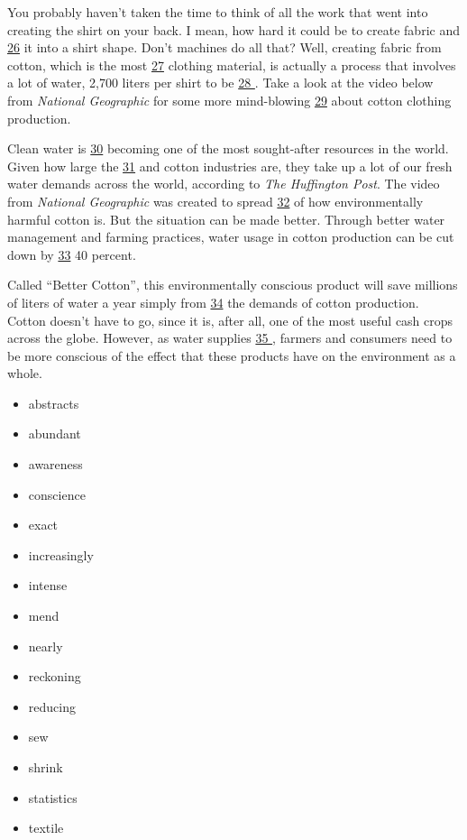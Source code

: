 \documentclass[UTF8,11pt]{ctexart}
\begin{document}
You probably haven’t taken the time to think of all the work that went into creating the shirt on your back. I mean, how hard it could be to create fabric and \uline{26} it into a shirt shape. Don’t machines do all that? Well, creating fabric from cotton, which is the most \uline{27} clothing material, is actually a process that involves a lot of water, 2,700 liters per shirt to be \uline{28 }. Take a look at the video below from \textit{National Geographic} for some more mind-blowing \uline{29} about cotton clothing production.


Clean water is \uline{30} becoming one of the most sought-after resources in the world. Given how large the \uline{31} and cotton industries are, they take up a lot of our fresh water demands across the world, according to \textit{The Huffington Post}. The video from \textit{National Geographic} was created to spread \uline{32} of how environmentally harmful cotton is. But the situation can be made better. Through better water management and farming practices, water usage in cotton production can be cut down by \uline{33} 40 percent.


Called “Better Cotton”, this environmentally conscious product will save millions of liters of water a year simply from \uline{34} the demands of cotton production. Cotton doesn’t have to go, since it is, after all, one of the most useful cash crops across the globe. However, as water supplies \uline{35 }, farmers and consumers need to be more conscious of the effect that these products have on the environment as a whole.


\begin{itemize}[leftmargin=2em,itemsep=.2em,topsep=.4em]\item[A.] abstracts
\item[B.] abundant
\item[C.] awareness
\item[D.] conscience
\item[E.] exact
\item[F.] increasingly
\item[G.] intense
\item[H.] mend
\item[I.] nearly
\item[J.] reckoning
\item[K.] reducing
\item[L.] sew
\item[M.] shrink
\item[N.] statistics
\item[O.] textile
\end{itemize}
\end{document}
